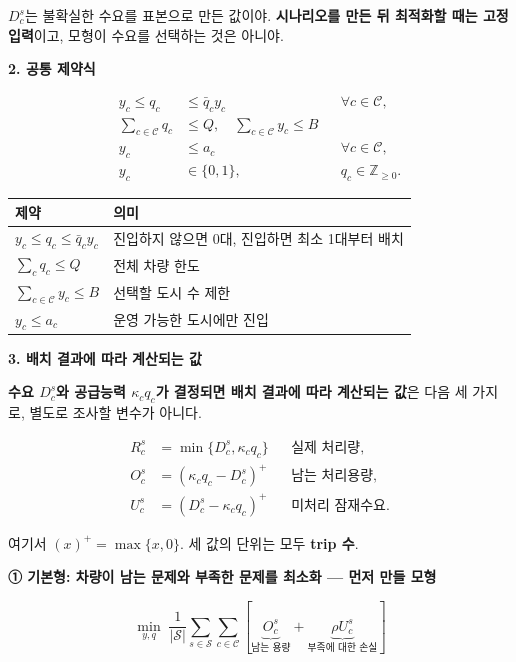\documentclass[11pt,a4paper]{article}
\newcommand{\blocktitle}[1]{\par\bigskip\noindent\textbf{\large #1}\par\smallskip}
\begin{document}
$D_c^s$는 불확실한 수요를 표본으로 만든 값이야. \textbf{시나리오를 만든 뒤 최적화할 때는 고정 입력}이고, 모형이 수요를 선택하는 것은 아니야.

\blocktitle{2. 공통 제약식}

\[
\boxed{
\begin{aligned}
y_c\le q_c&\le \bar q_c y_c &&\forall c\in\mathcal C,\\
\sum_{c\in\mathcal C}q_c&\le Q, \quad \sum_{c\in\mathcal C}y_c\le B\\
y_c&\le a_c &&\forall c\in\mathcal C,\\
y_c&\in\{0,1\},\quad &&q_c\in\mathbb Z_{\ge0}.
\end{aligned}}
\]

\begin{longtable}{@{}P{0.34\textwidth}P{0.60\textwidth}@{}}
\toprule
제약 & 의미 \\
\midrule
\endhead
$y_c\le q_c\le\bar q_cy_c$ & 진입하지 않으면 0대, 진입하면 최소 1대부터 배치 \\
$\sum_cq_c\le Q$ & 전체 차량 한도 \\
$\sum_{c\in\mathcal C}y_c\le B$ & 선택할 도시 수 제한\\
$y_c\le a_c$ & 운영 가능한 도시에만 진입 \\

\bottomrule
\end{longtable}

\blocktitle{3. 배치 결과에 따라 계산되는 값}
\textbf{수요 $D_c^s$와 공급능력 $\kappa_cq_c$가 결정되면 배치 결과에 따라 계산되는 값}은 다음 세 가지로, 별도로 조사할 변수가 아니다.

\[
\begin{aligned}
R_c^s&=\min\{D_c^s,\kappa_cq_c\}
&&\text{실제 처리량},\\
O_c^s&=(\kappa_cq_c-D_c^s)^+
&&\text{남는 처리용량},\\
U_c^s&=(D_c^s-\kappa_cq_c)^+
&&\text{미처리 잠재수요}.
\end{aligned}
\]

여기서 $(x)^+=\max\{x,0\}$. 세 값의 단위는 모두 \textbf{trip 수}.


\blocktitle{① 기본형: 차량이 남는 문제와 부족한 문제를 최소화 — 먼저 만들 모형}

\[
\boxed{
\min_{y,q}\;
\frac{1}{|\mathcal S|}
\sum_{s\in\mathcal S}\sum_{c\in\mathcal C}
\left[
\underbrace{O_c^s}_{\text{남는 용량}}
+
\underbrace{\rho U_c^s}_{\text{부족에 대한 손실}}
\right]
}
\]
\end{document}

